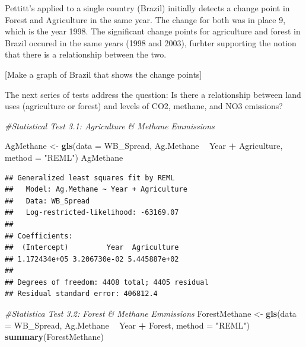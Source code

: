 \documentclass[12pt,]{article}
\newenvironment{Shaded}{\begin{snugshade}}{\end{snugshade}}
\newcommand{\KeywordTok}[1]{\textcolor[rgb]{0.13,0.29,0.53}{\textbf{#1}}}
\newcommand{\DataTypeTok}[1]{\textcolor[rgb]{0.13,0.29,0.53}{#1}}
\newcommand{\StringTok}[1]{\textcolor[rgb]{0.31,0.60,0.02}{#1}}
\newcommand{\CommentTok}[1]{\textcolor[rgb]{0.56,0.35,0.01}{\textit{#1}}}
\newcommand{\OperatorTok}[1]{\textcolor[rgb]{0.81,0.36,0.00}{\textbf{#1}}}
\newcommand{\NormalTok}[1]{#1}
\begin{document}
\begin{Shaded}
\end{Shaded}

Pettitt's applied to a single country (Brazil) initially detects a
change point in Forest and Agriculture in the same year. The change for
both was in place 9, which is the year 1998. The significant change
points for agriculture and forest in Brazil occured in the same years
(1998 and 2003), furhter supporting the notion that there is a
relationship between the two.

{[}Make a graph of Brazil that shows the change points{]}

The next series of tests address the question: Is there a relationship
between land uses (agriculture or forest) and levels of CO2, methane,
and NO3 emissions?

\begin{Shaded}
\begin{Highlighting}[]
\CommentTok{#Statistical Test 3.1: Agriculture & Methane Emmissions}

\NormalTok{AgMethane <-}\StringTok{ }\KeywordTok{gls}\NormalTok{(}\DataTypeTok{data =}\NormalTok{ WB_Spread,}
\NormalTok{                 Ag.Methane }\OperatorTok{~}\StringTok{ }\NormalTok{Year }\OperatorTok{+}\StringTok{ }\NormalTok{Agriculture,}
                 \DataTypeTok{method =} \StringTok{"REML"}\NormalTok{)}
\NormalTok{AgMethane}
\end{Highlighting}
\end{Shaded}

\begin{verbatim}
## Generalized least squares fit by REML
##   Model: Ag.Methane ~ Year + Agriculture 
##   Data: WB_Spread 
##   Log-restricted-likelihood: -63169.07
## 
## Coefficients:
##  (Intercept)         Year  Agriculture 
## 1.172434e+05 3.206730e-02 5.445887e+02 
## 
## Degrees of freedom: 4408 total; 4405 residual
## Residual standard error: 406812.4
\end{verbatim}

\begin{Shaded}
\begin{Highlighting}[]
\CommentTok{#Statistica Test 3.2: Forest & Methane Emmissions}
\NormalTok{ForestMethane <-}\StringTok{ }\KeywordTok{gls}\NormalTok{(}\DataTypeTok{data =}\NormalTok{ WB_Spread, }
\NormalTok{                  Ag.Methane }\OperatorTok{~}\StringTok{ }\NormalTok{Year }\OperatorTok{+}\StringTok{ }\NormalTok{Forest,}
                  \DataTypeTok{method =} \StringTok{"REML"}\NormalTok{)}
\KeywordTok{summary}\NormalTok{(ForestMethane)}
\end{Highlighting}
\end{Shaded}
\end{document}

